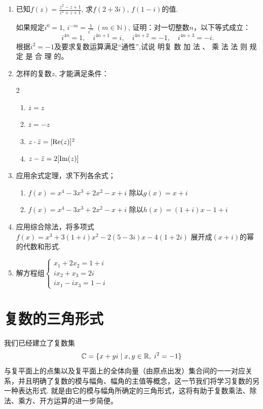 \begin{enumerate}
\item 已知$f(z)=\frac{z^2-z+1}{z^2+z+1}$, 求$f(2+3i)$, $f(1-i)$的值.

\staritem  如果规定$i^0=1$, $i^{-m}=\frac{1}{i^m}\; (m\in\mathbb{N})$, 证明：对一切整数$n$，以下等式成立：
$$i^{4n}={1},\quad i^{4n+1}=i,\quad  i^{4n+2}=-1,\quad  i^{4n+3}=-i.$$
\staritem 根据$i^2=-1$及要求复数运算满足“通性”,试说
明复 数 加 法 、 乘 法 法 则 规 定 是 合 理 的。

\item 怎样的复数$z$, 才能满足条件：
\begin{multicols}{2}
\begin{enumerate}[(1)]
    \item $\overline {z}= z$
    \item $\overline {z}= -z$
    \item $z\cdot \bar z=[{\rm Re}(z)]^2$
    \item $z-\bar z=2[{\rm Im}(z)]$
\end{enumerate}    
\end{multicols}

\item 应用余式定理，求下列各余式；
\begin{enumerate}[(1)]
    \item $f( x) = x^{4}- 3x^{3}+ 2x^{2}- x+ i$
除以$g(x)=x+i$
\item $f( x) = x^{4}- 3x^{3}+ 2x^{2}- x+ i$
除以$h(x)=(1+i)x-1+i$
\end{enumerate}
\item 应用综合除法，将多项式
$f\left(x\right)=x^{3}+3\left({1+i}\right)x^{2}-2(5-3i)x-4\left(1+2i\right)$
展开成$(x+i)$的幂的代数和形式.

\item 解方程组$\begin{cases}
    x_1+2x_2=1+i\\
    ix_2+x_3=2i\\
    ix_1-ix_3=1-i
\end{cases}$
\end{enumerate}

\section{复数的三角形式}

我们已经建立了复数集
\[\mathbb{C}=\{x+yi\mid x,y\in\mathbb{R},\; i^2=-1\}\]
与复平面上的点集以及复平面上的全体向量（由原点出发）集合间的一一对应关系，并且明确了复数的模与幅角、幅角的主值等概念，这一节我们将学习复数的另一种表达形式. 就是由它的模与幅角所确定的三角形式，这将有助于复数乘法、除法、乘方、开方运算的进一步简便。

